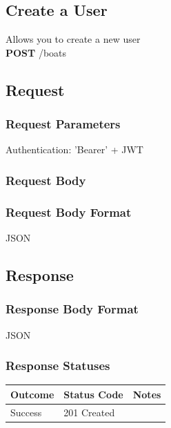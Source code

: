 \documentclass[letterpaper,11pt,titlepage,draftclsnofoot,onecolumn,compsoc,utf8,latin1]{IEEEtran}
\begin{document}
\begin{singlespace}
\section{Create a User}

Allows you to create a new user\\

\noindent \textbf{POST} /boats

\subsection{Request}

\subsubsection{Request Parameters}

Authentication: 'Bearer' + JWT

\subsubsection{Request Body}


\subsubsection{Request Body Format}

JSON

\subsection{Response}
\subsubsection{Response Body Format}

JSON

\subsubsection{Response Statuses}

\begin{center}
\begin{tabular}{ |p{}|p{}|p{}| } 
 \hline
 \textbf{Outcome} & \textbf{Status Code} & \textbf{Notes}  \\  \hline
 Success & 201 Created &  \\ 
 \hline
\end{tabular}
\end{center}


\end{singlespace}
\end{document}
